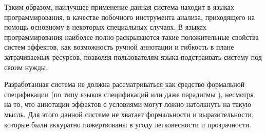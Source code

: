 Таким образом, наилучшее применение данная система находит в языках программирования, в качестве побочного инструмента анализа, приходящего на помощь основному в некоторых специальных случаях. В языках программирования наиболее полно раскрываются такие положительные свойства систем эффектов, как возможность ручной аннотации и гибкость в плане затрачиваемых ресурсов, позволяя пользователям языка подстраивать систему под своим нужды.

Разработанная система не должна рассматриваться как средство формальной спецификации (по типу языков спецификаций или даже парадигмы ), несмотря на то, что аннотации эффектов с условиями могут ложно натолкнуть на такую мысль. Для этого данной системе не хватает формальности и выразительности, которые были аккуратно пожертвованы в угоду легковесности и прозрачности.
